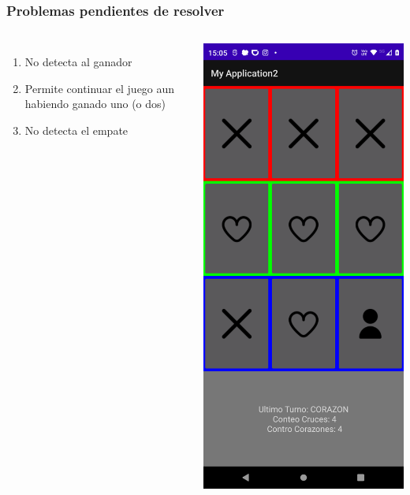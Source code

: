 \begin{frame}[fragile]
\frametitle{Problemas pendientes de resolver} 
\begin{columns}
\begin{enumerate}
\item No detecta al ganador
\item Permite continuar el juego aun habiendo ganado uno (o dos)
\item No detecta el empate
\end{enumerate}

\begin{center}
\includegraphics[width=0.95\linewidth]{00_ComportamientoAplicacionTicTacToe/Etapa2_Fase2C.png}  
\end{center}


\end{columns}
\end{frame}
